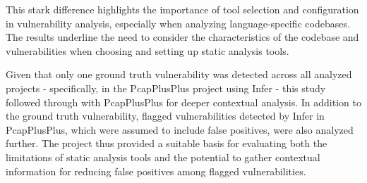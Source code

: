 This stark difference highlights the importance of tool selection and configuration in vulnerability analysis, especially when analyzing language-specific codebases. The results underline the need to consider the characteristics of the codebase and vulnerabilities when choosing and setting up static analysis tools.

Given that only one ground truth vulnerability was detected across all analyzed projects - specifically, in the PcapPlusPlus project using Infer - this study followed through with PcapPlusPlus for deeper contextual analysis. In addition to the ground truth vulnerability, flagged vulnerabilities detected by Infer in PcapPlusPlus, which were assumed to include false positives, were also analyzed further. The project thus provided a suitable basis for evaluating both the limitations of static analysis tools and the potential to gather contextual information for reducing false positives among flagged vulnerabilities.
